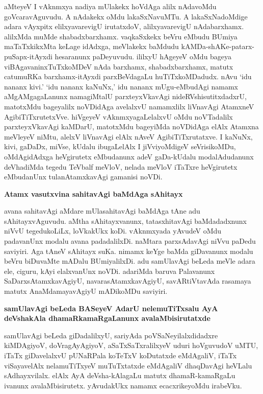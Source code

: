 \noindent
aMteyeV I vAknmxya nadiya mUlakekx hoVdAga alilx nAdavoMdu goVcaravAguvudu. A nAdakekx oMdu lakaSxNavuMTu. A lakaSxNadoMdige adara vAyxpitx elilxyavarevigU irutatxdoV, alilxyavare\-vigU nAdabarxhamx. alilxMda muMde shabadxbarxhamx. vaqkaSxkekx beVru eMbudu BUmiya maTaTxkikxMta keLage idAdxga, meVlakekx baMdudu kAMDa-shAKe-patarx-puSapx-itAyxdi hesaranunx paDeyuvudu. ililxyU hAgeyeV oMdu bageya viBAgavaninxTuTxkoMDeV nAda barxhamx, shabadxbarxhamx, matutx catumuRKa barxhamx-itAyxdi parxBeVda\-gaLu huTiTxkoMDadudx. nAvu `idu nananx kivi.' `idu nananx kaNuNx,' idu nananx mUgu-eMbudAgi namamx\- aMgAMgagaLanunx namagiMtalU parxteyxVkavAgi nideRVshisutitxdadxrU, matotxMdu bageyalilx noVDi\-dAga avelalxvU namamxlilx liVnavAgi AtamxneV AgibiTiTxrutetxVve. hiVgeyeV vAknmxyagaLelalxvU oMdu noVTa\-dalilx parxteyxVkavAgi kaMDarU, matotxMdu bageyiMda noVDidAga elAlx Atamxna meVleyeV niMtu, alelxV liVnavAgi elAlx nAveV AgibiTiTxrutatxve. I kaNuNx, kivi, gaDaDx, miVse, kUdalu ibugaLelAlx I jiVvi\-yoMdigeV seVrisikoMDu, oMdAgidAdxga heVgirutetx eMbudanunx adeV gaDa-kUdalu modalAdudanunx deVhadiMda tegedu TeVbalf meVloV, nelada meVloV iTaTxre heVgirutetx eMbudanUnx tulanAtamxka\-vAgi gamanisi noVDi.

{\bigskip
\noindent
{\large\bf Atamx vasutxvina sahitavAgi baMdAga sAhitayx}}\label{196}
\medskip

\noindent
avana sahitavAgi aMdare mUlasahitavAgi baMdAga tAne adu sAhitayxvAgu\-vudu. aMtha sAhitayx\-vanunx, tatasxhitavAgi baMdadadxnunx niVvU tegedukoLiLx, loVkakUkx koDi. vAknmxyada yAvudeV oMdu padavanUnx modalu avana padadalilxDi. \hbox{naMtara} parxsAdavAgi niVvu paDedu saviyiri. Aga tAneV sAhitayx\- suKa. nimamx keYge baMda giDavanunx modalu beVru biDuvaMte mADalu BUmiyalilxDi. adu samUla\-vAgi beLeda meVle adara ele, ciguru, kAyi elalxvanUnx noVDi. adariMda baruva Palavanunx SaDarxsAtamxka\-vAgiyU, navarasAtamxkavAgiyU, savARtiVtavAda rasamaya matutx AnaMdamayavAgiyU mADi\-koMDu saviyiri.

{\bigskip
\noindent
{\large\bf samUlavAgi beLeda BASeyeV AdarU nelemuTiTxsalu AyA deVshakAla dhamaRkamaRgaLanunx avalaMbisirutatxde}}\label{page196}
\medskip

\noindent
samUlavAgi beLeda giDadalilxyU, sariyAda poVSaNeyilalxdidadxre kiMDAgiyoV, doVragAyA\-giyoV, aSaTxSaTxralilxyeV uduri hoVguvudoV uMTU, iTaTx giDa\-velalxvU pUNaRPala koTeTxV koDu\-tatxde eMdAgaliV, iTaTx viSayavelAlx nela\break\-muTiTxyeV muTuTxtatxde eMdAgaliV dhaqDavAgi heVLalu sAdhayx\-vilalx. elAlx AyA deVsha-kAlagaLu matutx dhamaR-kamaRgaLu ivanunx avalaMbisirutetx. yAvu\-dakUkx namamx ecacxrikeyoMdu irabeVku.

